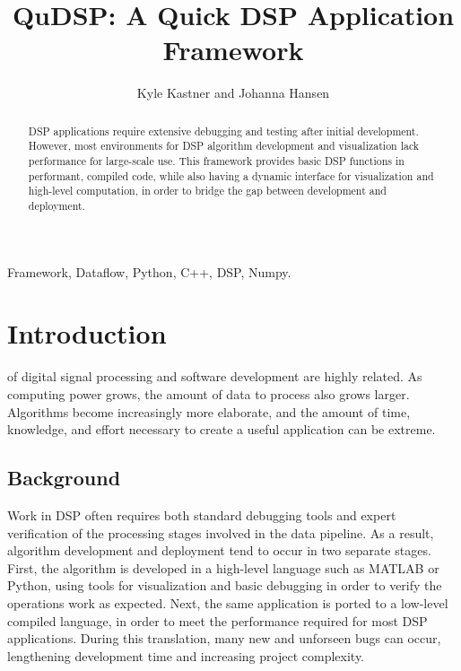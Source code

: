 \documentclass[journal]{IEEEtran}
\begin{document}
\title{QuDSP: A Quick DSP Application Framework}

\author{Kyle Kastner and Johanna Hansen}%

\maketitle

\begin{abstract}
DSP applications require extensive debugging and testing after initial development. However, most environments 
for DSP algorithm development and visualization lack performance for large-scale use.
This framework provides basic DSP functions in performant, compiled code, while also having a dynamic
interface for visualization and high-level computation, in order to bridge the gap between development and deployment. 
\end{abstract}

\begin{IEEEkeywords}
Framework, Dataflow, Python, C++, DSP, Numpy.
\end{IEEEkeywords}

\IEEEpeerreviewmaketitle
\section{Introduction}
 of digital signal processing and software development are highly related. As computing power
grows, the amount of data to process also grows larger. Algorithms become increasingly more elaborate, and the amount of time, knowledge,
and effort necessary to create a useful application can be extreme.

\subsection{Background}
Work in DSP often requires both standard debugging tools and expert verification of the processing stages involved 
in the data pipeline. As a result, algorithm development and deployment tend to occur in two separate stages.
First, the algorithm is developed in a high-level language such as MATLAB or Python, using tools for visualization 
and basic debugging in order to verify the operations work as expected. Next, the same application is ported to a low-level compiled
language, in order to meet the performance required for most DSP applications. During this translation, many new and
unforseen bugs can occur, lengthening development time and increasing project complexity. 
\end{document}
